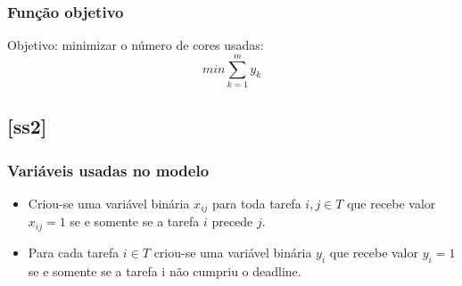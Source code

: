 \documentclass[11pt,letterpaper]{article}
\begin{document}
\subsubsection*{Função objetivo}
Objetivo: minimizar o número de cores usadas:
\begin{equation}
  min\sum_{k=1}^{m}y_k
\end{equation}


\subsection{{[}ss2{]}}
\subsubsection*{Variáveis usadas no modelo}
\begin{itemize}
\item Criou-se uma variável binária $x_{ij}$ para toda tarefa $i, j
  \in T$ que recebe valor $x_{ij}=1$ se e somente se a
  tarefa $i$ precede $j$.

\item Para cada tarefa $i \in T$ criou-se uma variável binária $y_{i}$
  que recebe valor $y_{i}=1$ se e somente se a tarefa i não cumpriu o deadline.
\end{itemize}
\end{document}
